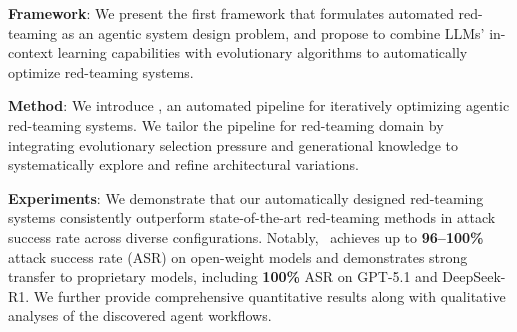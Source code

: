 \textbf{Framework}: We present the first framework that formulates automated red-teaming as an agentic system design problem, and propose to combine LLMs’ in-context learning capabilities with evolutionary algorithms to automatically optimize red-teaming systems. %

\textbf{Method}: We introduce \method, an automated pipeline for iteratively optimizing agentic red-teaming systems. We tailor the pipeline for red-teaming domain by integrating evolutionary selection pressure and generational knowledge to systematically explore and refine architectural variations.

\textbf{Experiments}: We demonstrate that our automatically designed red-teaming systems consistently outperform state-of-the-art red-teaming methods in attack success rate across diverse configurations. Notably, \method~achieves up to \textbf{96–100\%} attack success rate (ASR) on open-weight models and demonstrates strong transfer to proprietary models, including \textbf{100\%} ASR on GPT-5.1 and DeepSeek-R1. We further provide comprehensive quantitative results along with qualitative analyses of the discovered agent workflows.



